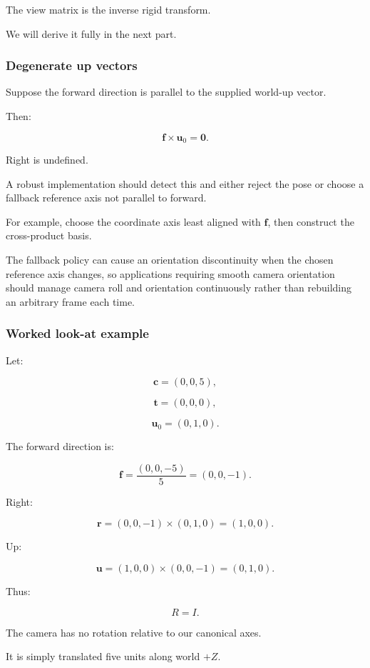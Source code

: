 The view matrix is the inverse rigid transform.

We will derive it fully in the next part.

\subsubsection{Degenerate up vectors}\label{02-foundations-ii-ch032-degenerate-up-vectors}

Suppose the forward direction is parallel to the supplied world-up vector.

Then:

\[
 \mathbf f\times\mathbf u_0=\mathbf0.
\]

Right is undefined.

A robust implementation should detect this and either reject the pose or choose a fallback reference axis not parallel to forward.

For example, choose the coordinate axis least aligned with \(\mathbf f\), then construct the cross-product basis.

The fallback policy can cause an orientation discontinuity when the chosen reference axis changes, so applications requiring smooth camera orientation should manage camera roll and orientation continuously rather than rebuilding an arbitrary frame each time.

\subsubsection{Worked look-at example}\label{02-foundations-ii-ch032-worked-look-at-example}

Let:

\[
 \mathbf c=(0,0,5),
\]

\[
 \mathbf t=(0,0,0),
\]

\[
 \mathbf u_0=(0,1,0).
\]

The forward direction is:

\[
 \mathbf f= \frac{(0,0,-5)}5 = (0,0,-1).
\]

Right:

\[
 \mathbf r=(0,0,-1)\times(0,1,0) =(1,0,0).
\]

Up:

\[
 \mathbf u=(1,0,0)\times(0,0,-1) =(0,1,0).
\]

Thus:

\[
 R=I.
\]

The camera has no rotation relative to our canonical axes.

It is simply translated five units along world \(+Z\).

